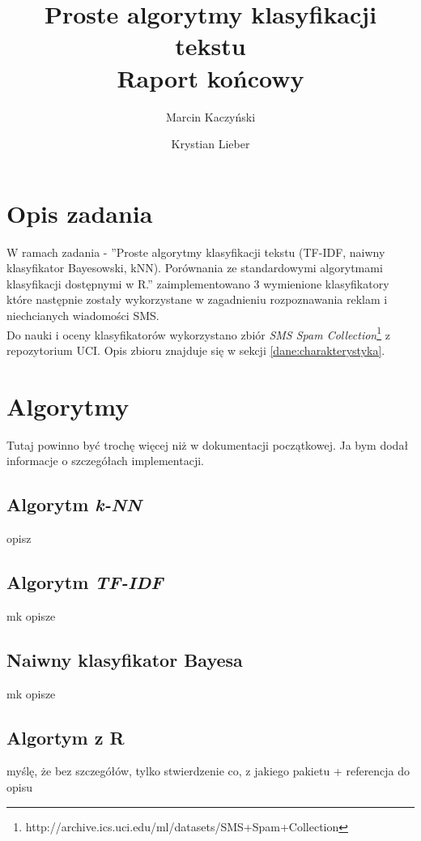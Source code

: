 \documentclass[a4paper,12pt]{article}
\title{Proste algorytmy klasyfikacji tekstu \\ Raport końcowy}
\author{Marcin Kaczyński \and Krystian Lieber}
\begin{document}
\maketitle

\section{Opis zadania} 

W ramach zadania - ''Proste algorytmy klasyfikacji tekstu (TF-IDF, naiwny klasyfikator Bayesowski, kNN). Porównania ze standardowymi algorytmami klasyfikacji dostępnymi w R.'' zaimplementowano 3 wymienione klasyfikatory które następnie zostały wykorzystane w zagadnieniu rozpoznawania reklam i niechcianych wiadomości SMS.\\

Do nauki i oceny klasyfikatorów wykorzystano zbiór \textit{SMS Spam Collection}\footnote{http://archive.ics.uci.edu/ml/datasets/SMS+Spam+Collection} z repozytorium UCI. Opis zbioru znajduje się w sekcji \ref{dane:charakterystyka}.

\section{Algorytmy}

Tutaj powinno być trochę więcej niż w dokumentacji początkowej. Ja bym dodał informacje o szczegółach implementacji.

\subsection{Algorytm \textit{k-NN}}

opisz

\subsection{Algorytm \textit{TF-IDF}}

mk opisze

\subsection{Naiwny klasyfikator Bayesa}

mk opisze

\subsection{Algortym z R}

myślę, że bez szczegółów, tylko stwierdzenie co, z jakiego pakietu + referencja do opisu
\end{document}
